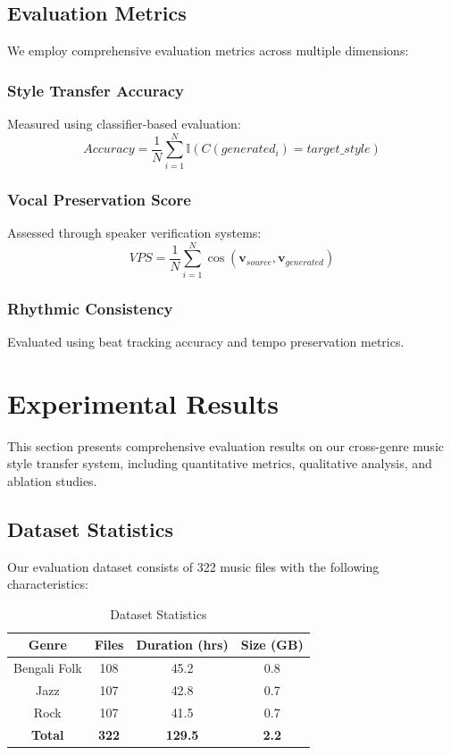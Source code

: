 \documentclass[conference]{IEEEtran}
\begin{document}
\subsection{Evaluation Metrics}
We employ comprehensive evaluation metrics across multiple dimensions:

\subsubsection{Style Transfer Accuracy}
Measured using classifier-based evaluation:
\begin{equation}
Accuracy = \frac{1}{N} \sum_{i=1}^N \mathbb{I}(C(generated_i) = target\_style)
\label{eq:accuracy}
\end{equation}

\subsubsection{Vocal Preservation Score}
Assessed through speaker verification systems:
\begin{equation}
VPS = \frac{1}{N} \sum_{i=1}^N \cos(\mathbf{v}_{source}, \mathbf{v}_{generated})
\label{eq:vps}
\end{equation}

\subsubsection{Rhythmic Consistency}
Evaluated using beat tracking accuracy and tempo preservation metrics.

\section{Experimental Results}
This section presents comprehensive evaluation results on our cross-genre music style transfer system, including quantitative metrics, qualitative analysis, and ablation studies.

\subsection{Dataset Statistics}
Our evaluation dataset consists of 322 music files with the following characteristics:
\begin{table}[h]
\caption{Dataset Statistics}
\label{tab:dataset}
\begin{center}
\begin{tabular}{|c|c|c|c|}
\hline
\textbf{Genre} & \textbf{Files} & \textbf{Duration (hrs)} & \textbf{Size (GB)} \\
\hline
Bengali Folk & 108 & 45.2 & 0.8 \\
Jazz & 107 & 42.8 & 0.7 \\
Rock & 107 & 41.5 & 0.7 \\
\hline
\textbf{Total} & \textbf{322} & \textbf{129.5} & \textbf{2.2} \\
\hline
\end{tabular}
\end{center}
\end{table}
\end{document}

